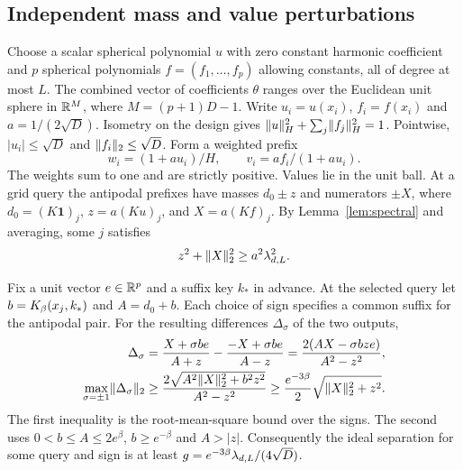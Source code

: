 \subsection{Independent mass and value perturbations}\label{sec:perturb}
Choose a scalar spherical polynomial $u$ with zero constant harmonic coefficient and $p$ spherical polynomials $f=(f_1,\ldots,f_p)$ allowing constants, all of degree at most $L$. The combined vector of coefficients $\theta$ ranges over the Euclidean unit sphere in $\mathbb R^M$, where $M=(p+1)D-1$. Write $u_i=u(x_i)$, $f_i=f(x_i)$ and $a=1/(2\sqrt D)$. Isometry on the design gives $\lVert u\rVert_H^2+\sum_j\lVert f_j\rVert_H^2=1$. Pointwise, $|u_i|\le\sqrt D$ and $\lVert f_i\rVert_2\le\sqrt D$. Form a weighted prefix
\begin{equation}
 w_i=(1+a u_i)/H,\qquad v_i= a f_i/(1+a u_i).
 \label{eq:weights}
\end{equation}
The weights sum to one and are strictly positive. Values lie in the unit ball. At a grid query the antipodal prefixes have masses $d_0\pm z$ and numerators $\pm X$, where $d_0=(K\mathbf1)_j$, $z=a(Ku)_j$, and $X=a(Kf)_j$. By Lemma~\ref{lem:spectral} and averaging, some $j$ satisfies
\begin{equation}
 z^2+\lVert X\rVert_2^2\ge a^2\lambda_{d,L}^2.\label{eq:signal}
\end{equation}

Fix a unit vector $e\in\mathbb R^p$ and a suffix key $k_*$ in advance. At the selected query let $b=K_\beta(x_j,k_*)$ and $A=d_0+b$. Each choice of sign specifies a common suffix for the antipodal pair. For the resulting differences $\Delta_\sigma$ of the two outputs,
\begin{align}
 \Delta_\sigma&=\frac{X+\sigma be}{A+z}-\frac{-X+\sigma be}{A-z}
 =\frac{2(AX-\sigma bze)}{A^2-z^2},\nonumber\\
 \max_{\sigma=\pm1}\lVert \Delta_\sigma\rVert_2
 &\ge \frac{2\sqrt{A^2\lVert X\rVert_2^2+b^2z^2}}{A^2-z^2}
 \ge \frac{e^{-3\beta}}2\sqrt{\lVert X\rVert_2^2+z^2}.
 \label{eq:twosigns}
\end{align}
The first inequality is the root-mean-square bound over the signs. The second uses $0<b\le A\le 2e^\beta$, $b\ge e^{-\beta}$ and $A>|z|$. Consequently the ideal separation for some query and sign is at least $g=e^{-3\beta}\lambda_{d,L}/(4\sqrt D)$.

